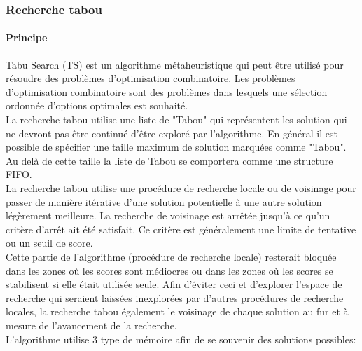 \subsubsection{Recherche tabou}
\paragraph{Principe}

Tabu Search (TS) est un algorithme métaheuristique qui peut être utilisé pour résoudre des problèmes d'optimisation combinatoire. Les problèmes d'optimisation combinatoire sont des problèmes dans lesquels une sélection ordonnée d'options optimales est souhaité. \\

La recherche tabou utilise une liste de "Tabou" qui représentent les solution qui ne devront pas être continué d'être exploré par l'algorithme. En général il est possible de spécifier une taille maximum de solution marquées comme "Tabou". Au delà de cette taille la liste de Tabou se comportera comme une structure FIFO. \\

La recherche tabou utilise une procédure de recherche locale ou de voisinage pour passer de manière itérative d'une solution potentielle à une autre solution légèrement meilleure. La recherche de voisinage est arrêtée jusqu'à ce qu'un critère d'arrêt ait été satisfait. Ce critère est généralement une limite de tentative ou un seuil de score. \\

Cette partie de l'algorithme (procédure de recherche locale) resterait bloquée dans les zones où les scores sont médiocres ou dans les zones où les scores se stabilisent si elle était utilisée seule. Afin d'éviter ceci et d'explorer l'espace de recherche qui seraient laissées inexplorées par d'autres procédures de recherche locales, la recherche tabou également le voisinage de chaque solution au fur et à mesure de l'avancement de la recherche. \\

\newpage
\noindent
L'algorithme utilise 3 type de mémoire afin de se souvenir des solutions possibles:

